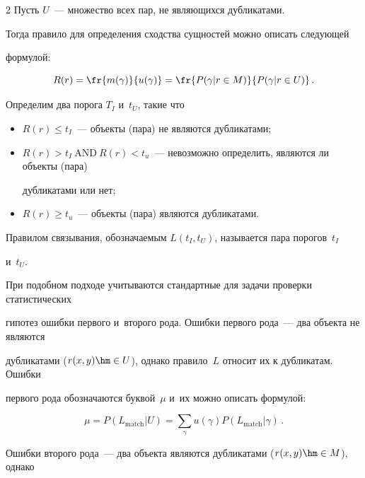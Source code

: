 \begin{multicols}{2}
  Пусть $U$~--- множество всех пар, не являющихся дубликатами.



  Тогда правило для определения сходства сущностей можно описать следующей

формулой:

  $$

  R(r)= \fr{m(\gamma)}{u(\gamma)} = \fr{P(\gamma\vert r\in M)}{P(\gamma \vert r\in U)}\,.

  $$





  Определим два порога $T_I$ и~$t_U$, такие что

  \begin{itemize}

  \item $R(r)\leq t_I$~--- объекты (пара) не являются дубликатами;\\[-13pt]

\item $R(r)>t_I\ \mathrm{AND}\ R(r)<t_u$~--- невозможно определить, являются ли объекты (пара)

дубликатами или нет;

\item $R(r)\geq t_u$~--- объекты (пара) являются дубликатами.

\end{itemize}



  Правилом связывания, обозначаемым $L(t_I,t_U)$, называется пара порогов~$t_I$

и~$t_U$.



  При подобном подходе учитываются стандартные для задачи проверки статистических

гипотез ошибки первого и~второго рода. Ошибки первого рода~--- два объекта не являются

дубликатами ($r(x,y)\hm\in U$), однако правило~$L$ относит их к дуб\-ли\-ка\-там. Ошибки

первого рода обозначаются бук\-вой~$\mu$ и~их можно описать формулой:

  $$

  \mu= P(L_{\mathrm{match}}\vert U) =\sum\limits_\gamma u(\gamma) P\left(L_{\mathrm{match}}\vert

\gamma\right)\,.

  $$



  Ошибки второго рода~--- два объекта являются дубликатами ($r(x,y)\hm\in M$), однако


\end{multicols}
